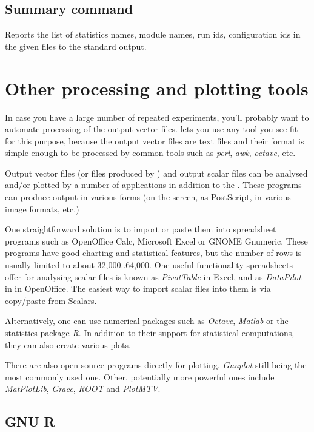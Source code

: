 \subsection{Summary command}

Reports the list of statistics names, module names, run ids, configuration
ids in the given files to the standard output.



\section{Other processing and plotting tools}

In case you have a large number of repeated experiments, you'll probably
want to automate processing of the output vector files. {\opp} lets you
use any tool you see fit for this purpose, because the output
vector files are text files and their format is simple enough to be
processed by common tools such as \textit{perl}, \textit{awk},
\textit{octave}, etc.

Output vector files (or files produced by ) and
output scalar files can be analysed and/or plotted by
a number of applications in addition to the .
These programs can produce output in various forms (on the screen,
as PostScript, in various image formats, etc.)

One straightforward solution is to import or paste them into spreadsheet
programs such as OpenOffice Calc, Microsoft Excel or GNOME Gnumeric.
These programs have good charting and statistical features, but the number
of rows is usually limited to about 32,000..64,000.
One useful functionality spreadsheets offer for analysing scalar files is
known as \textit{PivotTable} in Excel, and as \textit{DataPilot} in in OpenOffice.
The easiest way to import scalar files into them is via copy/paste
from Scalars.

Alternatively, one can use numerical packages such as \textit{Octave},
\textit{Matlab} or the statistics package \textit{R}.
In addition to their support for statistical computations, they can also
create various plots.

There are also open-source programs directly for plotting, \textit{Gnuplot}
still being the most commonly used one. Other, potentially more powerful ones
include \textit{MatPlotLib}, \textit{Grace}, \textit{ROOT} and \textit{PlotMTV}.


\subsection{GNU R}

